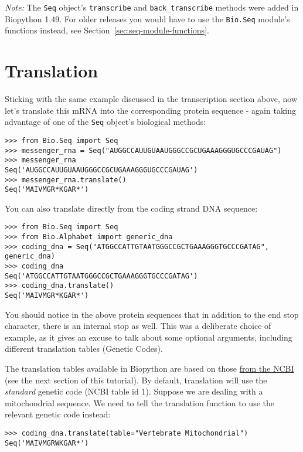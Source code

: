 \emph{Note:} The \verb|Seq| object's \verb|transcribe| and \verb|back_transcribe| methods
were added in Biopython 1.49.  For older releases you would have to use the \verb|Bio.Seq|
module's functions instead, see Section~\ref{sec:seq-module-functions}.

\section{Translation}
\label{sec:translation}
Sticking with the same example discussed in the transcription section above,
now let's translate this mRNA into the corresponding protein sequence - again taking
advantage of one of the \verb|Seq| object's biological methods:

\begin{verbatim}
>>> from Bio.Seq import Seq
>>> messenger_rna = Seq("AUGGCCAUUGUAAUGGGCCGCUGAAAGGGUGCCCGAUAG")
>>> messenger_rna
Seq('AUGGCCAUUGUAAUGGGCCGCUGAAAGGGUGCCCGAUAG')
>>> messenger_rna.translate()
Seq('MAIVMGR*KGAR*')
\end{verbatim}

You can also translate directly from the coding strand DNA sequence:

\begin{verbatim}
>>> from Bio.Seq import Seq
>>> from Bio.Alphabet import generic_dna
>>> coding_dna = Seq("ATGGCCATTGTAATGGGCCGCTGAAAGGGTGCCCGATAG", generic_dna)
>>> coding_dna
Seq('ATGGCCATTGTAATGGGCCGCTGAAAGGGTGCCCGATAG')
>>> coding_dna.translate()
Seq('MAIVMGR*KGAR*')
\end{verbatim}

You should notice in the above protein sequences that in addition to the end stop character, there is an internal stop as well.  This was a deliberate choice of example, as it gives an excuse to talk about some optional arguments, including different translation tables (Genetic Codes).

The translation tables available in Biopython are based on those \href{https://www.ncbi.nlm.nih.gov/Taxonomy/Utils/wprintgc.cgi}{from the NCBI} (see the next section of this tutorial).  By default, translation will use the \emph{standard} genetic code (NCBI table id 1).
Suppose we are dealing with a mitochondrial sequence.  We need to tell the translation function to use the relevant genetic code instead:

\begin{verbatim}
>>> coding_dna.translate(table="Vertebrate Mitochondrial")
Seq('MAIVMGRWKGAR*')
\end{verbatim}

